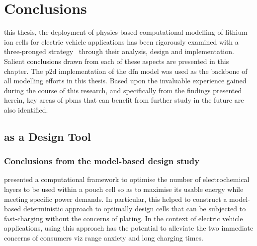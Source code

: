 
\graphicspath{{chapters/litt_review/figures/}}

\clearpage
\chapter{Conclusions}\label{ch:conclusions}
\startcontents[chapters]

\bigskip

 this  thesis, the  deployment of  physics-based computational
modelling  of lithium  ion  cells  for electric  vehicle  applications has  been
rigorously examined with a three-pronged strategy \viz~through their analysis,
design and implementation. Salient conclusions  drawn from each of these aspects
are presented  in this  chapter. The \gls{p2d}  implementation of  the \gls{dfn}
model was used  as the backbone of  all modelling efforts in  this thesis. Based
upon the  invaluable experience gained during  the course of this  research, and
specifically from the  findings presented herein, key areas  of \glspl{pbm} that
can benefit from further study in the future are also identified.


\section{ as a Design Tool}

\subsection{Conclusions from the model-based design study}\label{sec:modelbasedconclusion}

 presented  a computational framework to  optimise the
number  of electrochemical  layers to  be  used within  a  pouch cell  so as  to
maximise its usable energy while  meeting specific power demands. In particular,
this  helped to  construct  a model-based  deterministic  approach to  optimally
design cells  that can  be subjected  to fast-charging  without the  concerns of
plating. In  the context of  electric vehicle applications, using  this approach
has the  potential to alleviate  the two  immediate concerns of  consumers viz{}
range anxiety and long charging times.

